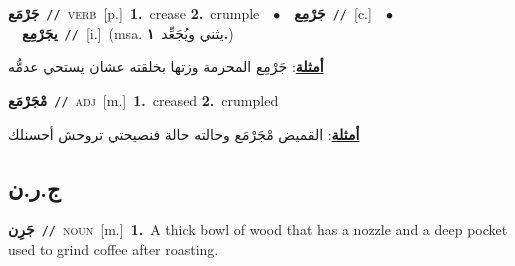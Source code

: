 \documentclass[10pt,a4paper,twoside]{article} %
\begin{document}
\begin{multicols}{2}
{\setlength\topsep{0pt}\textbf{\foreignlanguage{arabic}{جَرْمَع}}\ {\color{gray}\texttt{//}\color{black}}\ \textsc{verb}\ [p.]\ \textbf{1.}~crease  \textbf{2.}~crumple\ \ $\bullet$\ \ \setlength\topsep{0pt}\textbf{\foreignlanguage{arabic}{جَرْمِع}}\ {\color{gray}\texttt{//}\color{black}}\ [c.]\ \ $\bullet$\ \ \setlength\topsep{0pt}\textbf{\foreignlanguage{arabic}{يجَرْمِع}}\ {\color{gray}\texttt{//}\color{black}}\ [i.]\ \color{gray}(msa. \foreignlanguage{arabic}{يثني ويُجَعِّد}~\foreignlanguage{arabic}{\textbf{١.}})\color{black}\  \begin{flushright}\color{gray}\foreignlanguage{arabic}{\textbf{\underline{\foreignlanguage{arabic}{أمثلة}}}: جَرْمِع المحرمة وزتها بخلقته عشان يستحي عدمُّه}\end{flushright}\color{black}} \vspace{2mm}

{\setlength\topsep{0pt}\textbf{\foreignlanguage{arabic}{مْجَرْمَع}}\ {\color{gray}\texttt{//}\color{black}}\ \textsc{adj}\ [m.]\ \textbf{1.}~creased  \textbf{2.}~crumpled\  \begin{flushright}\color{gray}\foreignlanguage{arabic}{\textbf{\underline{\foreignlanguage{arabic}{أمثلة}}}: القميض مْجَرْمَع وحالته حالة فنصيحتي تروحش أحسنلك}\end{flushright}\color{black}} \vspace{2mm}

\vspace{-3mm}
\subsection*{\color{blue}\foreignlanguage{arabic}{ج.ر.ن}\color{blue}{}} 

{\setlength\topsep{0pt}\textbf{\foreignlanguage{arabic}{جَرِن}}\ {\color{gray}\texttt{//}\color{black}}\ \textsc{noun}\ [m.]\ \textbf{1.}~A thick bowl of wood that has a nozzle and a deep pocket used to grind coffee after roasting.\ } \vspace{2mm}


\end{multicols}
\end{document}
